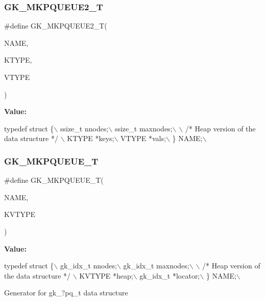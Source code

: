 \subsubsection{\texorpdfstring{G\+K\+\_\+\+M\+K\+P\+Q\+U\+E\+U\+E2\+\_\+T}{GK\_MKPQUEUE2\_T}}
{\footnotesize\ttfamily \#define G\+K\+\_\+\+M\+K\+P\+Q\+U\+E\+U\+E2\+\_\+T(\begin{DoxyParamCaption}\item[{}]{N\+A\+ME,  }\item[{}]{K\+T\+Y\+PE,  }\item[{}]{V\+T\+Y\+PE }\end{DoxyParamCaption})}

{\bfseries Value\+:}
\begin{DoxyCode}
\textcolor{keyword}{typedef} \textcolor{keyword}{struct }\{\(\backslash\)
  ssize\_t nnodes;\(\backslash\)
  ssize\_t maxnodes;\(\backslash\)
\(\backslash\)
  \textcolor{comment}{/* Heap version of the data structure */} \(\backslash\)
  KTYPE *keys;\(\backslash\)
  VTYPE *vals;\(\backslash\)
\} NAME;\(\backslash\)
\end{DoxyCode}
\mbox{\label{a00080_a57b321ad0a72d8cbe45cfe882aee7b2f}} 
\subsubsection{\texorpdfstring{G\+K\+\_\+\+M\+K\+P\+Q\+U\+E\+U\+E\+\_\+T}{GK\_MKPQUEUE\_T}}
{\footnotesize\ttfamily \#define G\+K\+\_\+\+M\+K\+P\+Q\+U\+E\+U\+E\+\_\+T(\begin{DoxyParamCaption}\item[{}]{N\+A\+ME,  }\item[{}]{K\+V\+T\+Y\+PE }\end{DoxyParamCaption})}

{\bfseries Value\+:}
\begin{DoxyCode}
\textcolor{keyword}{typedef} \textcolor{keyword}{struct }\{\(\backslash\)
  gk\_idx\_t nnodes;\(\backslash\)
  gk\_idx\_t maxnodes;\(\backslash\)
\(\backslash\)
  \textcolor{comment}{/* Heap version of the data structure */} \(\backslash\)
  KVTYPE   *heap;\(\backslash\)
  gk\_idx\_t *locator;\(\backslash\)
\} NAME;\(\backslash\)
\end{DoxyCode}
Generator for gk\+\_\+?pq\+\_\+t data structure 


